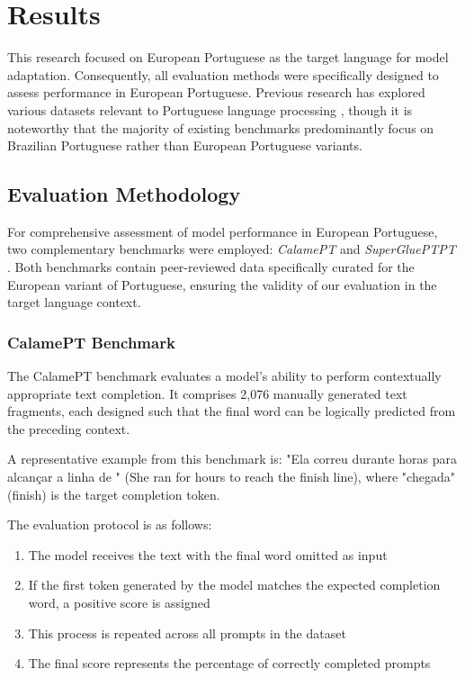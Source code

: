 
\chapter{Results}


\label{chap:results}

This research focused on European Portuguese as the target language for model adaptation. Consequently, all evaluation methods were specifically designed to assess performance in European Portuguese. Previous research has explored various datasets relevant to Portuguese language processing \cite{rodrigues2020, santos2019, branco2021}, though it is noteworthy that the majority of existing benchmarks predominantly focus on Brazilian Portuguese rather than European Portuguese variants.


\section{Evaluation Methodology}
For comprehensive assessment of model performance in European Portuguese, two complementary benchmarks were employed: \textit{CalamePT} \cite{calamept_reference} and \textit{SuperGluePTPT} \cite{superglue_reference}. Both benchmarks contain peer-reviewed data specifically curated for the European variant of Portuguese, ensuring the validity of our evaluation in the target language context.

\subsection{CalamePT Benchmark}
The CalamePT benchmark evaluates a model's ability to perform contextually appropriate text completion. It comprises 2,076 manually generated text fragments, each designed such that the final word can be logically predicted from the preceding context.

A representative example from this benchmark is: "Ela correu durante horas para alcançar a linha de " (She ran for hours to reach the finish line), where "chegada" (finish) is the target completion token.

The evaluation protocol is as follows:
\begin{enumerate}
    \item The model receives the text with the final word omitted as input
    \item If the first token generated by the model matches the expected completion word, a positive score is assigned
    \item This process is repeated across all prompts in the dataset
    \item The final score represents the percentage of correctly completed prompts
\end{enumerate}

